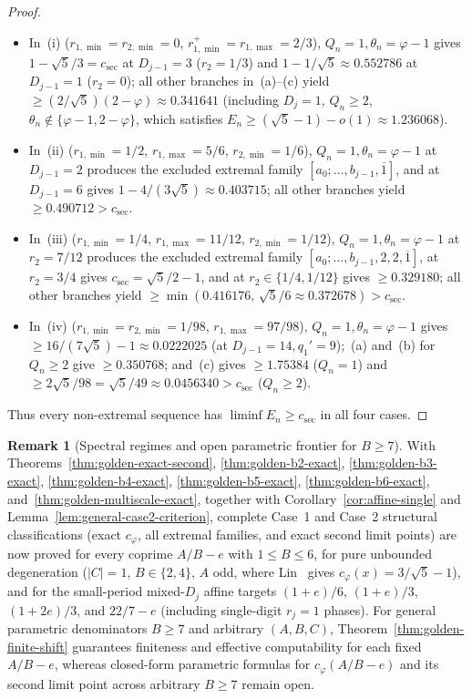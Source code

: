 \documentclass[11pt]{amsart}
\theoremstyle{definition}
\newtheorem{remark}[theorem]{Remark}
\theoremstyle{remark}
\numberwithin{equation}{section}
\begin{document}
\begin{proof}
\begin{itemize}
\item In~(i) ($r_{1,\min}=r_{2,\min}=0$, $r_{1,\min}^+=r_{1,\max}=2/3$),
      $Q_n=1,\theta_n=\varphi-1$ gives $1-\sqrt5/3=c_{\mathrm{sec}}$ at $D_{j-1}=3$
      ($r_2=1/3$) and $1-1/\sqrt5\approx0.552786$ at $D_{j-1}=1$ ($r_2=0$);
      all other branches in~(a)--(c) yield $\ge(2/\sqrt5)(2-\varphi)\approx0.341641$
      (including $D_j=1$, $Q_n\ge2$, $\theta_n\notin\{\varphi-1,2-\varphi\}$,
      which satisfies $E_n\ge(\sqrt5-1)-o(1)\approx1.236068$).
\item In~(ii) ($r_{1,\min}=1/2$, $r_{1,\max}=5/6$, $r_{2,\min}=1/6$),
      $Q_n=1,\theta_n=\varphi-1$ at $D_{j-1}=2$ produces the excluded extremal
      family $[a_0;\ldots,b_{j-1},\overline1]$, and at $D_{j-1}=6$ gives
      $1-4/(3\sqrt5)\approx0.403715$; all other branches yield $\ge0.490712>c_{\mathrm{sec}}$.
\item In~(iii) ($r_{1,\min}=1/4$, $r_{1,\max}=11/12$, $r_{2,\min}=1/12$),
      $Q_n=1,\theta_n=\varphi-1$ at $r_2=7/12$ produces the excluded extremal
      family $[a_0;\ldots,b_{j-1},2,2,\overline1]$, at $r_2=3/4$ gives
      $c_{\mathrm{sec}}=\sqrt5/2-1$, and at $r_2\in\{1/4,1/12\}$ gives $\ge0.329180$;
      all other branches yield $\ge\min(0.416176,\,\sqrt5/6\approx0.372678)>c_{\mathrm{sec}}$.
\item In~(iv) ($r_{1,\min}=r_{2,\min}=1/98$, $r_{1,\max}=97/98$),
      $Q_n=1,\theta_n=\varphi-1$ gives $\ge16/(7\sqrt5)-1\approx0.0222025$
      (at $D_{j-1}=14, q_1'=9$);~(a) and~(b) for $Q_n\ge2$ give $\ge0.350768$;
      and~(c) gives $\ge1.75384$ ($Q_n=1$) and $\ge2\sqrt5/98=\sqrt5/49\approx0.0456340>c_{\mathrm{sec}}$
      ($Q_n\ge2$).
\end{itemize}
Thus every non-extremal sequence has $\liminf E_n\ge c_{\mathrm{sec}}$ in all four cases.
\end{proof}

\begin{remark}[Spectral regimes and open parametric frontier for $B\ge7$]\label{rem:golden-general-regimes}
With Theorems~\ref{thm:golden-exact-second}, \ref{thm:golden-b2-exact},
\ref{thm:golden-b3-exact}, \ref{thm:golden-b4-exact}, \ref{thm:golden-b5-exact},
\ref{thm:golden-b6-exact}, and~\ref{thm:golden-multiscale-exact}, together with
Corollary~\ref{cor:affine-single} and Lemma~\ref{lem:general-case2-criterion},
complete Case~1 and Case~2 structural classifications (exact $c_\varphi$, all
extremal families, and exact second limit points) are now proved for every
coprime $A/B-e$ with $1\le B\le 6$, for pure unbounded degeneration ($|C|=1$,
$B\in\{2,4\}$, $A$ odd, where Lin~\cite[Lemma~4.2]{Lin2018} gives
$c_\varphi(x)=3/\sqrt5-1$), and for the small-period mixed-$D_j$ affine targets
$(1+e)/6$, $(1+e)/3$, $(1+2e)/3$, and $22/7-e$ (including single-digit
$r_j=1$ phases). For general parametric denominators $B\ge7$ and arbitrary
$(A,B,C)$, Theorem~\ref{thm:golden-finite-shift} guarantees finiteness and
effective computability for each fixed $A/B-e$, whereas closed-form parametric
formulas for $c_\varphi(A/B-e)$ and its second limit point across arbitrary
$B\ge7$ remain open.
\end{remark}
\end{document}
